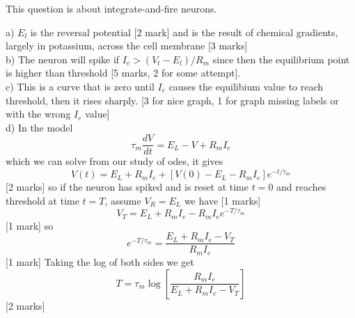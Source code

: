 \documentclass{cs-uob-exam}
\begin{document}
\begin{questions}

\question This question is about integrate-and-fire neurons.

\begin{solution}
a) $E_l$ is the reversal potential [2 mark] and is the result of
chemical gradients, largely in potassium, across the cell membrane [3
  marks]\\ b) The neuron will spike if $I_e>(V_t-E_l)/R_m$
since then the equilibrium point is higher than threshold [5 marks, 2
  for some attempt].\\c) This is a curve that is zero until $I_e$ causes the equilibium value to reach threshold, then it rises sharply. [3 for nice graph, 1 for graph missing labels or with the wrong $I_e$ value]\\
d) In the model 
$$
\tau_m\frac{dV}{dt}=E_L-V+R_mI_e
$$
which we can solve from our study of odes, it gives
$$
V(t)=E_L+R_mI_e+[V(0)-E_L-R_mI_e]e^{-t/\tau_m}
$$
[2 marks]
so if the neuron has spiked and is reset at time $t=0$ and reaches
threshold at time $t=T$, assume $V_R=E_L$ we have [1 marks]
$$
V_T=E_L+R_mI_e-R_mI_ee^{-T/\tau_m}
$$
[1 mark] so 
$$
e^{-T/\tau_m}=\frac{E_L+R_mI_e-V_T}{R_mI_e}
$$
[1 mark] Taking the log of both sides we get
$$
T=\tau_m\log\left[\frac{R_mI_e}{E_L+R_mI_e-V_T}\right]
$$
[2 marks]
\end{solution}


\end{questions}
\end{document}

